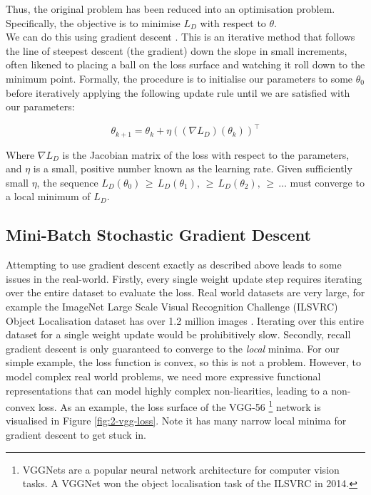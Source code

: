 Thus, the original problem has been reduced into an optimisation problem. Specifically, the objective is to minimise \(L_D\) with respect to \(\theta\). \\

We can do this using gradient descent \cite{Cauchy1847}. This is an iterative method that follows the line of steepest descent (the gradient) down the slope in small increments, often likened to placing a ball on the loss surface and watching it roll down to the minimum point. Formally, the procedure is to initialise our parameters to some \(\theta_0\) before iteratively applying the following update rule until we are satisfied with our parameters:

\begin{equation*}
    \theta_{k+1} = \theta_k + \eta((\nabla L_D)(\theta_k))^\top
\end{equation*}

Where \(\nabla L_D\) is the Jacobian matrix of the loss with respect to the parameters, and \(\eta\) is a small, positive number known as the learning rate. Given sufficiently small \(\eta\), the sequence \(L_D(\theta_0) \,\geq\, L_D(\theta_1), \,\geq\, L_D(\theta_2), \,\geq\, \ldots\) must converge to a local minimum of \(L_D\). 

\subsection{Mini-Batch Stochastic Gradient Descent}
Attempting to use gradient descent exactly as described above leads to some issues in the real-world. Firstly, every single weight update step requires iterating over the entire dataset to evaluate the loss. Real world datasets are very large, for example the ImageNet Large Scale Visual Recognition Challenge (ILSVRC) Object Localisation dataset has over 1.2 million images \cite{ILSVRC15}. Iterating over this entire dataset for a single weight update would be prohibitively slow. Secondly, recall gradient descent is only guaranteed to converge to the \textit{local} minima. For our simple example, the loss function is convex, so this is not a problem. However, to model complex real world problems, we need more expressive functional representations that can model highly complex non-liearities, leading to a non-convex loss. As an example, the loss surface of the VGG-56 \footnote{VGGNets are a popular neural network architecture for computer vision tasks. A VGGNet won the object localisation task of the ILSVRC in 2014.} network \cite{Simonyan2014} is visualised in Figure \ref{fig:2-vgg-loss}. Note it has many narrow local minima for gradient descent to get stuck in.

